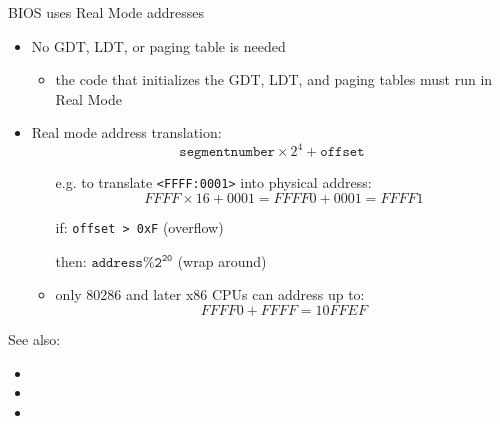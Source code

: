 \begin{frame}
  \begin{block}{BIOS uses Real Mode addresses}
    \begin{itemize}
    \item No GDT, LDT, or paging table is needed
      \begin{itemize}
      \item the code that initializes the GDT, LDT, and paging tables must run in Real Mode
      \end{itemize}
    \item Real mode address translation:
      $$\mathtt{segment number}\times{}2^4+\mathtt{offset}$$
      \begin{itemize}
      \item[e.g.] to translate \texttt{<FFFF:0001>} into physical address:
        $$FFFF \times{} 16 + 0001 = FFFF0 + 0001 = FFFF1$$
      \item[if:] \texttt{offset > 0xF} (overflow)
      \item[then:] $\mathtt{address \% 2^{20}}$ (wrap around)
      \item only 80286 and later x86 CPUs can address up to:
        $$FFFF0 + FFFF = 10FFEF$$
      \end{itemize}
    \end{itemize}
  \end{block}
\end{frame}

See also:
\begin{itemize}
\item {}
\item {}
\item {} 
\end{itemize}


